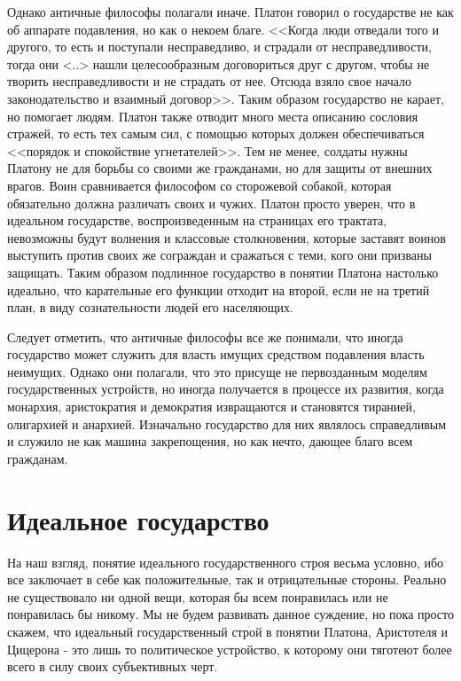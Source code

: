 	Однако античные философы полагали иначе. Платон говорил о государстве 
	не как об аппарате подавления, но как о некоем благе. <<Когда люди 
	отведали того и другого, то есть и поступали несправедливо, и 
	страдали от несправедливости, тогда они <..> нашли целесообразным 
	договориться друг с другом, чтобы не творить несправедливости и не 
	страдать от нее. Отсюда взяло свое начало законодательство и взаимный 
	договор>>. Таким образом государство не карает, но помогает людям. 
	Платон также отводит много места описанию сословия стражей, то есть 
	тех самым сил, с помощью которых должен обеспечиваться <<порядок и 
	спокойствие угнетателей>>. Тем не менее, солдаты нужны Платону не для 
	борьбы со своими же гражданами, но для защиты от внешних врагов. 
	Воин сравнивается философом со сторожевой собакой, которая обязательно 
	должна различать своих и чужих. Платон просто уверен, что в идеальном 
	государстве, воспроизведенным на страницах его трактата, невозможны 
	будут волнения и классовые столкновения, которые заставят воинов 
	выступить против своих же сограждан и сражаться с теми, кого они 
	призваны защищать. Таким образом подлинное государство в понятии 
	Платона настолько идеально, что карательные его функции отходит на 
	второй, если не на третий план, в виду сознательности людей его 
	населяющих.

	Следует отметить, что античные философы все же понимали, что иногда 
	государство может служить для власть имущих средством подавления власть 
	неимущих. Однако они полагали, что это присуще не первозданным моделям 
	государственных устройств, но иногда получается в процессе их развития, 
	когда монархия, аристократия и демократия извращаются и становятся 
	тиранией, олигархией и анархией. Изначально государство для них являлось 
	справедливым и служило не как машина закрепощения, но как нечто, дающее 
	благо всем гражданам.

\pagebreak
\chapter{Идеальное государство}

	На наш взгляд, понятие идеального государственного строя весьма условно, 
	ибо все заключает в себе как положительные, так и отрицательные стороны. 
	Реально не существовало ни одной вещи, которая бы всем понравилась или не 
	понравилась бы никому. Мы не будем развивать данное суждение, но пока 
	просто скажем, что идеальный государственный строй в понятии Платона, 
	Аристотеля и Цицерона - это лишь то политическое устройство, к которому 
	они тяготеют более всего в силу своих субъективных черт.

